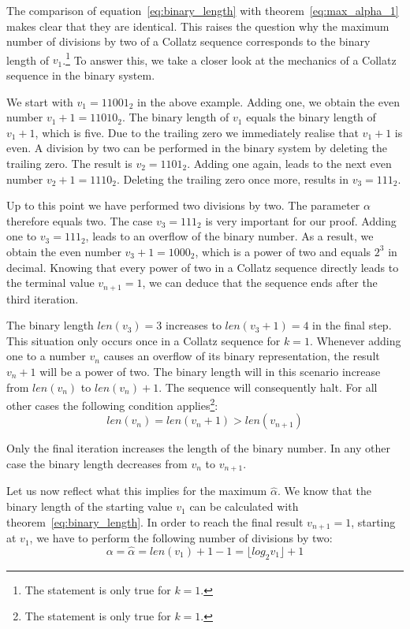 \documentclass{SciPress_2015}
\begin{document}
The comparison of equation~\ref{eq:binary_length} with theorem~\ref{eq:max_alpha_1} makes clear that they are identical. This raises the question why the maximum number of divisions by two of a Collatz sequence corresponds to the binary length of $v_1$.\footnote{The statement is only true for $k=1$.} To answer this, we take a closer look at the mechanics of a Collatz sequence in the binary system.

\par\medskip
We start with $v_1=11001_2$ in the above example. Adding one, we obtain the even number $v_1+1=11010_2$. The binary length of $v_1$ equals the binary length of $v_1+1$, which is five. Due to the trailing zero we immediately realise that $v_1+1$ is even. A division by two can be performed in the binary system by deleting the trailing zero. The result is $v_2=1101_2$. Adding one again, leads to the next even number $v_2+1=1110_2$. Deleting the trailing zero once more, results in $v_3=111_2$.

\par\medskip
Up to this point we have performed two divisions by two. The parameter $\alpha$ therefore equals two. The case $v_3=111_2$ is very important for our proof. Adding one to $v_3=111_2$, leads to an overflow of the binary number. As a result, we obtain the even number $v_3+1=1000_2$, which is a power of two and equals $2^3$ in decimal. Knowing that every power of two in a Collatz sequence directly leads to the terminal value $v_{n+1}=1$, we can deduce that the sequence ends after the third iteration.

\par\medskip
The binary length $len(v_3)=3$ increases to $len(v_3+1)=4$ in the final step. This situation only occurs once in a Collatz sequence for $k=1$. Whenever adding one to a number $v_n$ causes an overflow of its binary representation, the result $v_n+1$ will be a power of two. The binary length will in this scenario increase from $len(v_n)$ to $len(v_n)+1$. The sequence will consequently halt. For all other cases the following condition applies\footnote{The statement is only true for $k=1$.}:
\begin{equation}
	len(v_n)=len(v_n+1)>len(v_{n+1})
\end{equation}

Only the final iteration increases the length of the binary number. In any other case the binary length decreases from $v_n$ to $v_{n+1}$.

\par\medskip
Let us now reflect what this implies for the maximum $\hat\alpha$. We know that the binary length of the starting value $v_1$ can be calculated with theorem~\ref{eq:binary_length}. In order to reach the final result $v_{n+1}=1$, starting at $v_1$, we have to perform the following number of divisions by two:
\begin{equation}
	\alpha=\hat\alpha=len(v_1)+1-1=\lfloor log_2 v_1\rfloor+1
\end{equation}
\end{document}
